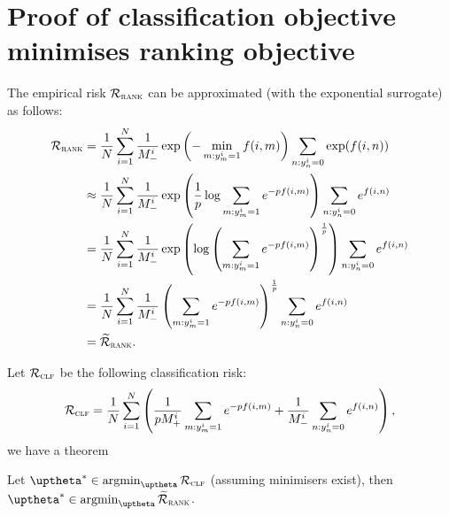 \section{Proof of classification objective minimises ranking objective}

The empirical risk $\mathcal{R}_\textsc{rank}$ can be approximated (with the exponential surrogate) as follows:
\begin{equation*}
\begin{aligned}
\mathcal{R}_\textsc{rank} 
&= \frac{1}{N} \sum_{i=1}^N \frac{1}{M_-^i} \exp \left( -\min_{m: y_m^i = 1} f(i, m) \right) \sum_{n: y_n^i = 0} \exp(f(i, n)) \\
&\approx \frac{1}{N} \sum_{i=1}^N \frac{1}{M_-^i} \exp \left( \frac{1}{p} \log\sum_{m: y_m^i = 1} e^{-p f(i, m)} \right)
         \sum_{n: y_n^i = 0} e^{f(i, n)} \\
&= \frac{1}{N} \sum_{i=1}^N \frac{1}{M_-^i} \exp \left( \log \left( \sum_{m: y_m^i = 1} e^{-p f(i, m)} \right)^\frac{1}{p} \right) 
   \sum_{n: y_n^i = 0} e^{f(i, n)} \\
&= \frac{1}{N} \sum_{i=1}^N \frac{1}{M_-^i} \left( \sum_{m: y_m^i = 1} e^{-p f(i, m)} \right)^\frac{1}{p} \sum_{n: y_n^i = 0} e^{f(i, n)} \\
&= \widetilde{\mathcal{R}}_\textsc{rank}.
\end{aligned}
\end{equation*}

Let $\mathcal{R}_\textsc{clf}$ be the following classification risk:
\begin{equation*}
\mathcal{R}_\textsc{clf} 
= \frac{1}{N} \sum_{i=1}^N \left( 
  \frac{1}{p M_+^i} \sum_{m: y_m^i = 1} e^{-p f(i, m)} 
  + \frac{1}{M_-^i} \sum_{n: y_n^i = 0} e^{f(i, n)} \right),
\end{equation*}
we have a theorem
\begin{theorem}
\label{th:rank2clf}
Let $\uptheta^* \in \argmin_{\uptheta} \RCal_\textsc{clf}$ (assuming minimisers exist), 
then $\uptheta^* \in \argmin_{\uptheta} \widetilde\RCal_\textsc{rank}$.
\end{theorem}

